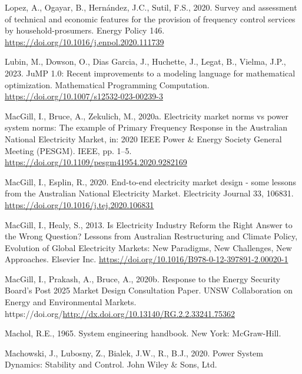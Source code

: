 \documentclass[12pt,a4paper,]{report}
\newlength{\cslhangindent}
\newenvironment{CSLReferences}[2] %
 {%
  \setlength{\parindent}{0pt}
  \ifodd #1 \everypar{\setlength{\hangindent}{\cslhangindent}}\ignorespaces\fi
  \ifnum #2 > 0
  \setlength{\parskip}{#2\baselineskip}
  \fi
 }%
 {}
\begin{document}
\begin{CSLReferences}{1}{0}
\leavevmode{}%
Lopez, A., Ogayar, B., Hernández, J.C., Sutil, F.S., 2020. Survey and
assessment of technical and economic features for the provision of
frequency control services by household-prosumers. Energy Policy 146.
\url{https://doi.org/10.1016/j.enpol.2020.111739}

\leavevmode{}%
Lubin, M., Dowson, O., Dias Garcia, J., Huchette, J., Legat, B., Vielma,
J.P., 2023. {JuMP} 1.0: {Recent} improvements to a modeling language for
mathematical optimization. Mathematical Programming Computation.
\url{https://doi.org/10.1007/s12532-023-00239-3}

\leavevmode{}%
MacGill, I., Bruce, A., Zekulich, M., 2020a. Electricity market norms vs
power system norms: The example of {Primary Frequency Response} in the
{Australian National Electricity Market}, in: 2020 {IEEE Power} \&
{Energy Society General Meeting} ({PESGM}). {IEEE}, pp. 1--5.
\url{https://doi.org/10.1109/pesgm41954.2020.9282169}

\leavevmode{}%
MacGill, I., Esplin, R., 2020. End-to-end electricity market design -
some lessons from the {Australian National Electricity Market}.
Electricity Journal 33, 106831.
\url{https://doi.org/10.1016/j.tej.2020.106831}

\leavevmode{}%
MacGill, I., Healy, S., 2013. Is {Electricity Industry Reform} the
{Right Answer} to the {Wrong Question}? {Lessons} from {Australian
Restructuring} and {Climate Policy}, Evolution of Global Electricity
Markets: New Paradigms, New Challenges, New Approaches. {Elsevier Inc.}
\url{https://doi.org/10.1016/B978-0-12-397891-2.00020-1}

\leavevmode{}%
MacGill, I., Prakash, A., Bruce, A., 2020b. Response to the {Energy
Security Board}'s {Post} 2025 {Market Design Consultation Paper}. {UNSW
Collaboration on Energy and Environmental Markets}.
https://doi.org/\url{http://dx.doi.org/10.13140/RG.2.2.33241.75362}

\leavevmode{}%
Machol, R.E., 1965. System engineering handbook. New York: McGraw-Hill.

\leavevmode{}%
Machowski, J., Lubosny, Z., Bialek, J.W., R., B.J., 2020. Power {System
Dynamics}: {Stability} and {Control}. {John Wiley \& Sons, Ltd}.


\end{CSLReferences}
\end{document}
